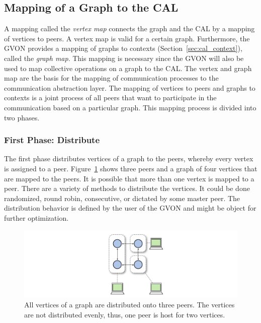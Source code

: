 \subsection{Mapping of a Graph to the CAL}
\label{sec:mapping}
A mapping called the \emph{vertex map} connects the graph and the CAL
by a mapping of vertices to peers.  A vertex map is valid for a
certain graph. Furthermore, the GVON provides a mapping of graphs to
contexts (Section~\ref{sec:cal_context}), called the \emph{graph
  map}. This mapping is necessary since the GVON will also be used to
map collective operations on a graph to the CAL.  The vertex and graph
map are the basis for the mapping of communication processes to the
communication abstraction layer.  The mapping of vertices to peers and
graphs to contexts is a joint process of all peers that want to
participate in the communication based on a particular graph. This
mapping process is divided into two phases.

\subsubsection*{First Phase: Distribute}
The first phase distributes vertices of a graph to the peers, whereby
every vertex is assigned to a peer.  Figure~\ref{fig:gvon_mapping}
shows three peers and a graph of four vertices that are mapped to the
peers. It is possible that more than one vertex is mapped to a peer.
There are a variety of methods to distribute the vertices.  It could be
done randomized, round robin, consecutive, or dictated by
some master peer. The distribution behavior is defined by the user of
the GVON and might be object for further optimization.

\begin{figure}[H]
  \centering \includegraphics[width=\textwidth]{graphics/30_gvon_mapping}
  \caption{All vertices of a graph are distributed onto three
    peers. The vertices are not distributed evenly, thus, one peer is
    host for two vertices.}
  \label{fig:gvon_mapping}
\end{figure}

